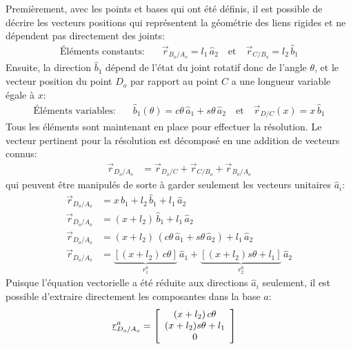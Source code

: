 Premièrement, avec les points et bases qui ont été définis, il est possible de décrire les vecteurs positions qui représentent la géométrie des liens rigides et ne dépendent pas directement des joints: 
\begin{align}
\text{Éléments constants:}& \quad \vec{r}_{B_o/A_o} = l_1 \, \hat{a}_2  \quad \text{et} \quad  \vec{r}_{C/B_o} = l_2 \, \hat{b}_1 
\end{align} 
Ensuite, la direction $\hat{b}_1$ dépend de l'état du joint rotatif donc de l'angle $\theta$, et le vecteur position du point $D_o$ par rapport au point $C$ a une longueur variable égale à $x$:
\begin{align}
\text{Éléments variables:}& \quad \hat{b}_1(\theta) = c\theta \, \hat{a}_1  + s\theta \, \hat{a}_2  \quad \text{et} \quad  \vec{r}_{D/C}(x) = x \, \hat{b}_1
\end{align} 
Tous les éléments sont maintenant en place pour effectuer la résolution. Le vecteur pertinent pour la résolution est décomposé en une addition de vecteurs connus:
\begin{align}
\vec{r}_{D_o/A_o}   &=  \vec{r}_{D_o/C} + \vec{r}_{C/B_o} + \vec{r}_{B_o/A_o} 
\end{align} 
qui peuvent être manipulés de sorte à garder seulement les vecteurs unitaires $\hat{a}_i$:
\begin{align}
\vec{r}_{D_o/A_o}   &=  x \, \hat{b}_1  + l_2 \, \hat{b}_1 + l_1 \, \hat{a}_2 \\
\vec{r}_{D_o/A_o}   &=            ( x + l_2 ) \, \hat{b}_1 + l_1 \, \hat{a}_2 \\
\vec{r}_{D_o/A_o}   &=  ( x + l_2 ) \, (  c\theta \, \hat{a}_1  + s\theta \, \hat{a}_2 ) + l_1 \, \hat{a}_2 \\
\vec{r}_{D_o/A_o}   &=  \underbrace{\left[  ( x + l_2 ) \, c\theta \right]}_{r_1^a}  \, \hat{a}_1  + \underbrace{\left[ ( x + l_2 ) s\theta  + l_1 \right]}_{r_2^a} \, \hat{a}_2 
\end{align} 
Puisque l'équation vectorielle a été réduite aux directions $\hat{a}_i$ seulement, il est possible d'extraire directement les composantes dans la base $a$:
\begin{align}
\underline{r}_{D_o/A_o}^a   &=  \left[ \begin{array}{c} 
( x + l_2 ) \, c\theta \\ ( x + l_2 ) s\theta  + l_1 \\ 0
\end{array} \right] 
\end{align} 

